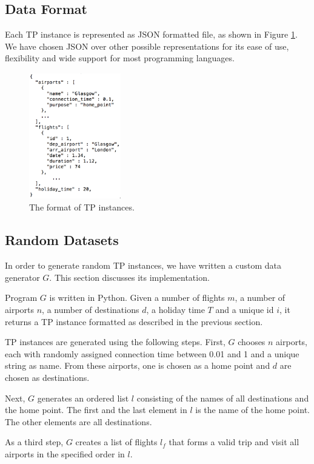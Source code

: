 \documentclass{mpaper}
\begin{document}
\subsection{Data Format}
Each TP instance is represented as JSON formatted file, as shown in Figure \ref{fig:dataFormat}. We have chosen JSON over other possible representations for its ease of use, flexibility and wide support for most programming languages.

\begin{figure}
\centering
\includegraphics[height=5.5cm, width=4cm]{images/dataFormat.png}
\caption{\label{fig:dataFormat}The format of TP instances.}
\end{figure}

\subsection{Random Datasets}
In order to generate random TP instances, we have written a custom data generator $G$. This section discusses its implementation.

Program $G$ is written in Python. Given a number of flights $m$, a number of airports $n$, a number of destinations $d$, a holiday time $T$ and a unique id $i$, it returns a TP instance formatted as described in the previous section.

TP instances are generated using the following steps. First, $G$ chooses $n$ airports, each with randomly assigned connection time between 0.01 and 1 and a unique string as name. From these airports, one is chosen as a home point and $d$ are chosen as destinations.

Next, $G$ generates an ordered list $l$ consisting of the names of all destinations and the home point. The first and the last element in $l$ is the name of the home point. The other elements are all destinations.

As a third step, $G$ creates a list of flights $l_f$ that forms a valid trip and visit all airports in the specified order in $l$.
\end{document}

